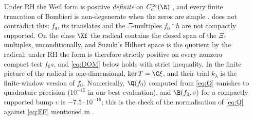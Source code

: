 \begin{remark}
Under RH the Weil form is positive \emph{definite} on $C_c^\infty(\R)$ \cite[\S1]{Suzuki2025}, and every finite truncation of Bombieri
is non-degenerate when the zeros are simple \cite[Lemma 10]{BOMBIERI-WEILQF-2000}.  does not contradict this: $f_0$,
its translates and the $\Xi$-multiples $f_0*h$ are not compactly supported. On the class $\Xf$ the radical contains the closed span of the
$\Xi$-multiples, unconditionally, and Suzuki's Hilbert space \cite{Suzuki2025} is the quotient by the radical; under RH the form is
therefore strictly positive on every nonzero compact test $f_0s$, and \eqref{eq:DOM} below holds with strict inequality.
In the finite picture of \cite[\S5.2]{CCM-ZST-2025} the radical is one-dimensional, $\ker T=\C\xi$, and their trial $k_\lambda$ is the
finite-window version of $f_0$. Numerically, $\Q(f_0)$ computed from \eqref{eq:Q} vanishes to quadrature precision ($10^{-15}$ in our best evaluation), and
$\B(f_0,v)$ for a compactly supported bump $v$ is $-7.5\cdot10^{-16}$; this is the check of the normalisation of \eqref{eq:Q} against
\eqref{eq:EF} mentioned in .
\end{remark}
